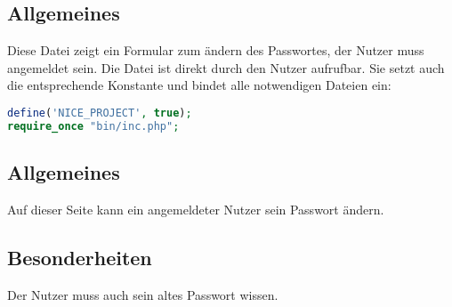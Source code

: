 \subsection{Allgemeines} Diese Datei zeigt ein Formular zum ändern des Passwortes, der Nutzer muss angemeldet sein.
Die Datei ist direkt durch den Nutzer aufrufbar. Sie setzt auch die entsprechende Konstante und bindet alle notwendigen Dateien ein:
\begin{lstlisting}[language=php]
define('NICE_PROJECT', true);
require_once "bin/inc.php";
\end{lstlisting}
\subsection{Allgemeines}
Auf dieser Seite kann ein angemeldeter Nutzer sein Passwort ändern.
\subsection{Besonderheiten}
Der Nutzer muss auch sein altes Passwort wissen.
